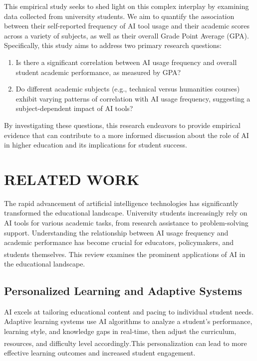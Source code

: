 \documentclass[manuscript,screen,review]{acmart}
\begin{document}
This empirical study seeks to shed light on this complex interplay by examining data collected from university students. We aim to quantify the association between their self-reported frequency of AI tool usage and their academic scores across a variety of subjects, as well as their overall Grade Point Average (GPA). Specifically, this study aims to address two primary research questions:
\begin{enumerate}
\item Is there a significant correlation between AI usage frequency and overall student academic performance, as measured by GPA?
\item Do different academic subjects (e.g., technical versus humanities courses) exhibit varying patterns of correlation with AI usage frequency, suggesting a subject-dependent impact of AI tools?
\end{enumerate}
By investigating these questions, this research endeavors to provide empirical evidence that can contribute to a more informed discussion about the role of AI in higher education and its implications for student success.
\section{RELATED WORK}

The rapid advancement of artificial intelligence technologies has significantly transformed the educational landscape. University students increasingly rely on AI tools for various academic tasks, from research assistance to problem-solving support. Understanding the relationship between AI usage frequency and academic performance has become crucial for educators, policymakers, and students themselves\textsuperscript{\cite{zawacki2019systematic}}.
This review examines the prominent applications of AI in the educational landscape.

\subsection{Personalized Learning and Adaptive Systems}
    AI excels at tailoring educational content and pacing to individual student needs. Adaptive learning systems use AI algorithms to analyze a student's performance, learning style, and knowledge gaps in real-time, then adjust the curriculum, resources, and difficulty level accordingly\textsuperscript{\cite{kaplan2019siri}}.This personalization can lead to more effective learning outcomes and increased student engagement.
\end{document}

